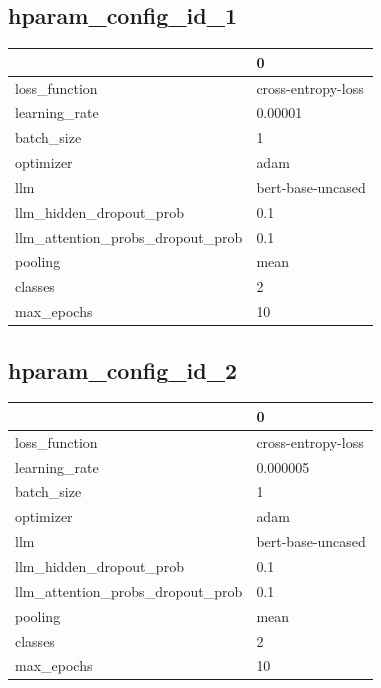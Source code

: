 \documentclass{article}
\begin{document}
\subsection{hparam\_config\_id\_1}
\begin{tabular}{ll}
\toprule
{} &                   0 \\
\midrule
loss\_function                    &  cross-entropy-loss \\
learning\_rate                    &             0.00001 \\
batch\_size                       &                   1 \\
optimizer                        &                adam \\
llm                              &   bert-base-uncased \\
llm\_hidden\_dropout\_prob          &                 0.1 \\
llm\_attention\_probs\_dropout\_prob &                 0.1 \\
pooling                          &                mean \\
classes                          &                   2 \\
max\_epochs                       &                  10 \\
\bottomrule
\end{tabular}

\subsection{hparam\_config\_id\_2}
\begin{tabular}{ll}
\toprule
{} &                   0 \\
\midrule
loss\_function                    &  cross-entropy-loss \\
learning\_rate                    &            0.000005 \\
batch\_size                       &                   1 \\
optimizer                        &                adam \\
llm                              &   bert-base-uncased \\
llm\_hidden\_dropout\_prob          &                 0.1 \\
llm\_attention\_probs\_dropout\_prob &                 0.1 \\
pooling                          &                mean \\
classes                          &                   2 \\
max\_epochs                       &                  10 \\
\bottomrule
\end{tabular}
\end{document}
